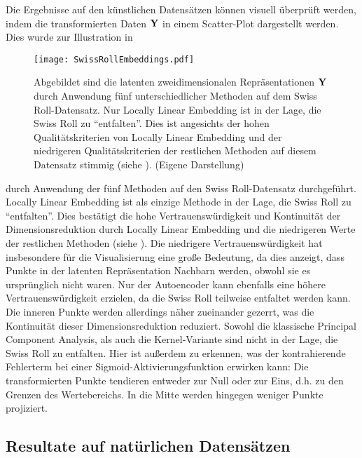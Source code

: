 Die Ergebnisse auf den künstlichen Datensätzen können visuell überprüft werden, indem die
transformierten Daten $\mat{Y}$ in einem Scatter-Plot dargestellt werden. Dies wurde zur
Illustration in 
\begin{figure}[ht]
	\centering
	\texttt{[image: SwissRollEmbeddings.pdf]}
	\caption[Latente zweidimensionale Repräsentationen $\mat{Y}$ von fünf unterschiedlichen Methoden auf dem Swiss Roll-Datensatz]{Abgebildet sind die latenten zweidimensionalen Repräsentationen $\mat{Y}$ durch Anwendung fünf unterschiedlicher Methoden auf dem Swiss Roll-Datensatz. Nur Locally Linear Embedding ist in der Lage, die Swiss Roll zu \enquote{entfalten}. Dies ist angesichts der hohen Qualitätskriterien von Locally Linear Embedding und der niedrigeren Qualitätskriterien der restlichen Methoden auf diesem Datensatz stimmig (siehe ). (Eigene Darstellung)}
	\label{fig:SwissRollEmbeddings}
\end{figure}
durch Anwendung der fünf Methoden auf den Swiss Roll-Datensatz durchgeführt.
Locally Linear Embedding ist als einzige Methode in der Lage, die Swiss Roll zu
\enquote{entfalten}. Dies bestätigt die hohe Vertrauenswürdigkeit und Kontinuität der
Dimensionsreduktion durch Locally Linear Embedding und die niedrigeren Werte der restlichen
Methoden (siehe ). Die niedrigere Vertrauenswürdigkeit hat
insbesondere für die Visualisierung eine große Bedeutung, da dies anzeigt, dass Punkte in der
latenten Repräsentation Nachbarn werden, obwohl sie es ursprünglich nicht waren. Nur der
Autoencoder kann ebenfalls eine höhere Vertrauenswürdigkeit erzielen, da die Swiss Roll teilweise
entfaltet werden kann. Die inneren Punkte werden allerdings näher zueinander gezerrt, was die
Kontinuität dieser Dimensionsreduktion reduziert. Sowohl die klassische Principal Component
Analysis, als auch die Kernel-Variante sind nicht in der Lage, die Swiss Roll zu entfalten. Hier
ist außerdem zu erkennen, was der kontrahierende Fehlerterm bei einer Sigmoid-Aktivierungsfunktion
erwirken kann: Die transformierten Punkte tendieren entweder zur Null oder zur Eins, d.h. zu den
Grenzen des Wertebereichs. In die Mitte werden hingegen weniger Punkte projiziert.

\subsection{Resultate auf natürlichen Datensätzen}
\label{ch:Vergleich:sec:Resultate:natuerlich}

